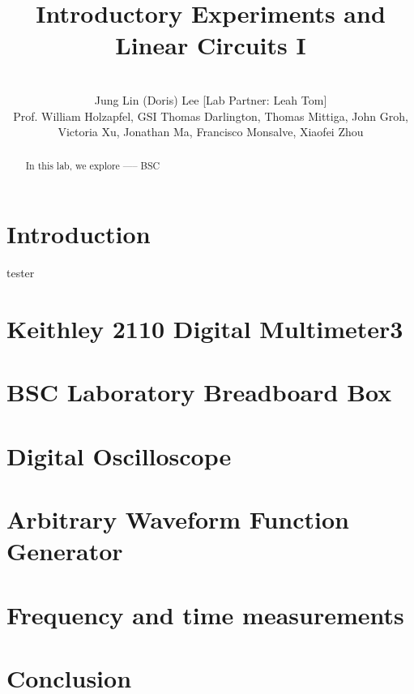 \documentclass[10pt,letterpaper,oneside] {article}
\begin{document}
\title{Introductory Experiments and Linear Circuits I}
\author{\quad \\Jung Lin (Doris) Lee [Lab Partner: Leah Tom]\\Prof. William Holzapfel, GSI Thomas Darlington, Thomas Mittiga, John Groh,  \\Victoria Xu, Jonathan Ma, Francisco Monsalve, Xiaofei Zhou}
\maketitle
	\begin{abstract}
	In this lab, we explore ----- BSC 
	\end{abstract}


\section{Introduction}
 
 tester 
\section{Keithley 2110 Digital Multimeter3}
\section{BSC Laboratory Breadboard Box}
\section{Digital Oscilloscope}
\section{Arbitrary Waveform Function Generator}
\section{Frequency and time measurements}
 \section{Conclusion}


\end{document}
